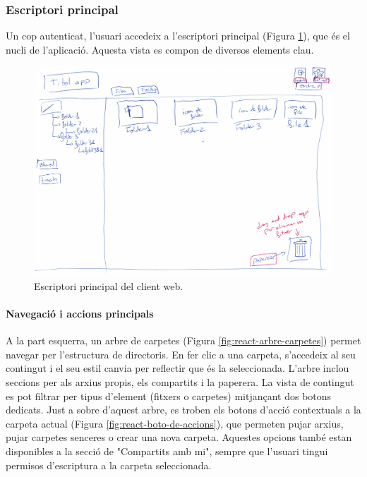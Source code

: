 \subsubsection{Escriptori principal}
Un cop autenticat, l'usuari accedeix a l'escriptori principal (Figura \ref{fig:react-pantalla-principal}), que és el nucli de l'aplicació. Aquesta vista es compon de diversos elements clau.

\begin{figure}[H]
    \centering
    \includegraphics[width=\textwidth]{Figures/interficies/react-pantalla-principal.jpg}
    \caption{Escriptori principal del client web.}
    \label{fig:react-pantalla-principal}
\end{figure}

\paragraph{Navegació i accions principals}
A la part esquerra, un arbre de carpetes (Figura \ref{fig:react-arbre-carpetes}) permet navegar per l'estructura de directoris. En fer clic a una carpeta, s'accedeix al seu contingut i el seu estil canvia per reflectir que és la seleccionada. L'arbre inclou seccions per als arxius propis, els compartits i la paperera. La vista de contingut es pot filtrar per tipus d'element (fitxers o carpetes) mitjançant dos botons dedicats. Just a sobre d'aquest arbre, es troben els botons d'acció contextuals a la carpeta actual (Figura \ref{fig:react-boto-de-accions}), que permeten pujar arxius, pujar carpetes senceres o crear una nova carpeta. Aquestes opcions també estan disponibles a la secció de "Compartits amb mi", sempre que l'usuari tingui permisos d'escriptura a la carpeta seleccionada.

